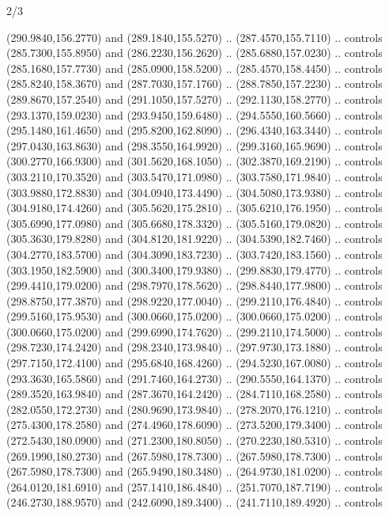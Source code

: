 \begin{flagdescription}{2/3}
\begin{scope}[xshift=0.5\flaglength,yshift=0.5\flagwidth,scale=\flagwidth/259.2]
\begin{scope}[y=0.8pt, x=0.8pt, yscale=-1,shift={(-243,-162)}]
      (290.9840,156.2770) and (289.1840,155.5270) .. (287.4570,155.7110) .. controls
      (285.7300,155.8950) and (286.2230,156.2620) .. (285.6880,157.0230) .. controls
      (285.1680,157.7730) and (285.0900,158.5200) .. (285.4570,158.4450) .. controls
      (285.8240,158.3670) and (287.7030,157.1760) .. (288.7850,157.2230) .. controls
      (289.8670,157.2540) and (291.1050,157.5270) .. (292.1130,158.2770) .. controls
      (293.1370,159.0230) and (293.9450,159.6480) .. (294.5550,160.5660) .. controls
      (295.1480,161.4650) and (295.8200,162.8090) .. (296.4340,163.3440) .. controls
      (297.0430,163.8630) and (298.3550,164.9920) .. (299.3160,165.9690) .. controls
      (300.2770,166.9300) and (301.5620,168.1050) .. (302.3870,169.2190) .. controls
      (303.2110,170.3520) and (303.5470,171.0980) .. (303.7580,171.9840) .. controls
      (303.9880,172.8830) and (304.0940,173.4490) .. (304.5080,173.9380) .. controls
      (304.9180,174.4260) and (305.5620,175.2810) .. (305.6210,176.1950) .. controls
      (305.6990,177.0980) and (305.6680,178.3320) .. (305.5160,179.0820) .. controls
      (305.3630,179.8280) and (304.8120,181.9220) .. (304.5390,182.7460) .. controls
      (304.2770,183.5700) and (304.3090,183.7230) .. (303.7420,183.1560) .. controls
      (303.1950,182.5900) and (300.3400,179.9380) .. (299.8830,179.4770) .. controls
      (299.4410,179.0200) and (298.7970,178.5620) .. (298.8440,177.9800) .. controls
      (298.8750,177.3870) and (298.9220,177.0040) .. (299.2110,176.4840) .. controls
      (299.5160,175.9530) and (300.0660,175.0200) .. (300.0660,175.0200) .. controls
      (300.0660,175.0200) and (299.6990,174.7620) .. (299.2110,174.5000) .. controls
      (298.7230,174.2420) and (298.2340,173.9840) .. (297.9730,173.1880) .. controls
      (297.7150,172.4100) and (295.6840,168.4260) .. (294.5230,167.0080) .. controls
      (293.3630,165.5860) and (291.7460,164.2730) .. (290.5550,164.1370) .. controls
      (289.3520,163.9840) and (287.3670,164.2420) .. (284.7110,168.2580) .. controls
      (282.0550,172.2730) and (280.9690,173.9840) .. (278.2070,176.1210) .. controls
      (275.4300,178.2580) and (274.4960,178.6090) .. (273.5200,179.3400) .. controls
      (272.5430,180.0900) and (271.2300,180.8050) .. (270.2230,180.5310) .. controls
      (269.1990,180.2730) and (267.5980,178.7300) .. (267.5980,178.7300) .. controls
      (267.5980,178.7300) and (265.9490,180.3480) .. (264.9730,181.0200) .. controls
      (264.0120,181.6910) and (257.1410,186.4840) .. (251.7070,187.7190) .. controls
      (246.2730,188.9570) and (242.6090,189.3400) .. (241.7110,189.4920) .. controls

\end{scope}
\end{scope}
\end{flagdescription}
